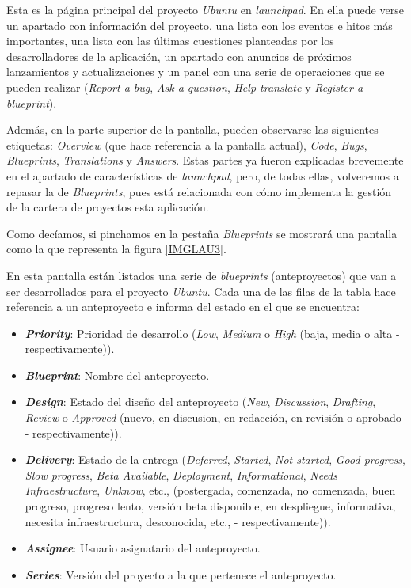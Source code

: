\documentclass[11pt,a4paper,spanish,twoside]{report}
\begin{document}
	Esta es la página principal del proyecto \emph{Ubuntu} en \emph{launchpad}.
	En ella puede verse un apartado con información del proyecto, una lista con
	los eventos e hitos más importantes, una lista con las últimas cuestiones
	planteadas por los desarrolladores de la aplicación, un apartado con
	anuncios de próximos lanzamientos y actualizaciones y un panel con una serie
	de operaciones que se pueden realizar (\emph{Report a bug}, \emph{Ask a
	question}, \emph{Help translate} y \emph{Register a blueprint}).
	
	Además, en la parte superior de la pantalla, pueden observarse las
	siguientes etiquetas: \emph{Overview} (que hace referencia a la pantalla
	actual), \emph{Code}, \emph{Bugs}, \emph{Blueprints}, \emph{Translations} y
	\emph{Answers}. Estas partes ya fueron explicadas brevemente en el apartado
	de características de \emph{launchpad}, pero, de todas ellas, volveremos a
	repasar la de \emph{Blueprints}, pues está relacionada con cómo implementa
	la gestión de la cartera de proyectos esta aplicación.

	Como decíamos, si pinchamos en la pestaña \emph{Blueprints} se mostrará una
	pantalla como la que representa la figura \ref{IMGLAU3}.


	En esta pantalla están listados una serie de \emph{blueprints}
	(anteproyectos) que van a ser desarrollados para el proyecto \emph{Ubuntu}.
	Cada una de las filas de la tabla hace referencia a un anteproyecto e
	informa del estado en el que se encuentra:
	\begin{itemize}
		\item \textbf{\emph{Priority}}: Prioridad de desarrollo (\emph{Low},
		\emph{Medium} o \emph{High} (baja, media o alta - respectivamente)).
		\item \textbf{\emph{Blueprint}}: Nombre del anteproyecto.
		\item \textbf{\emph{Design}}: Estado del diseño del anteproyecto
		(\emph{New}, \emph{Discussion}, \emph{Drafting}, \emph{Review} o
		\emph{Approved} (nuevo, en discusion, en redacción, en revisión o
		aprobado - respectivamente)).
		\item \textbf{\emph{Delivery}}: Estado de la entrega (\emph{Deferred},
		\emph{Started}, \emph{Not started}, \emph{Good progress}, 
		\emph{Slow progress}, \emph{Beta Available}, \emph{Deployment},
		\emph{Informational}, \emph{Needs Infraestructure}, \emph{Unknow}, etc.,
		(postergada, comenzada, no comenzada, buen progreso, progreso lento,
		versión beta disponible, en despliegue, informativa, necesita
		infraestructura, desconocida, etc., - respectivamente)).
		\item \textbf{\emph{Assignee}}: Usuario asignatario del anteproyecto.
                \item \textbf{\emph{Series}}: Versión del proyecto a la que pertenece el
                  anteproyecto.
              \end{itemize}
\end{document}
